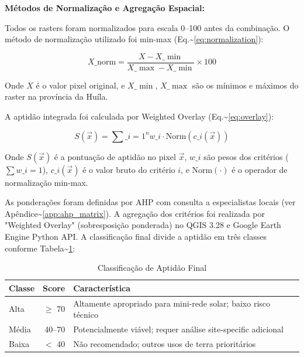 \documentclass[12pt, a4paper]{article}
\begin{document}
\noindent \textbf{Métodos de Normalização e Agregação Espacial:}

Todos os rasters foram normalizados para escala 0–100 antes da combinação. O método de normalização utilizado foi min-max (Eq.\textasciitilde{}\ref{eq:normalization}):

\begin{equation}
\label{eq:normalization}
X\_{\text{norm}} = \frac{X - X\_{\min}}{X\_{\max} - X\_{\min}} \times 100
\end{equation}

Onde $X$ é o valor pixel original, e $X\_{\min}$, $X\_{\max}$ são os mínimos e máximos do raster na província da Huíla.

A aptidão integrada foi calculada por Weighted Overlay (Eq.\textasciitilde{}\ref{eq:overlay}):

\begin{equation}
\label{eq:overlay}
S(\vec{x}) = \sum\_{i=1}^{n} w\_i \cdot \text{Norm}(c\_{i}(\vec{x}))
\end{equation}

Onde $S(\vec{x})$ é a pontuação de aptidão no pixel $\vec{x}$, $w\_i$ são pesos dos critérios ($\sum w\_i = 1$), $c\_i(\vec{x})$ é o valor bruto do critério $i$, e $\text{Norm}(\cdot)$ é o operador de normalização min-max.

As ponderações foram definidas por AHP com consulta a especialistas locais (ver Apêndice\textasciitilde{}\ref{app:ahp_matrix}). A agregação dos critérios foi realizada por "Weighted Overlay" (sobresposição ponderada) no QGIS 3.28 e Google Earth Engine Python API. A classificação final divide a aptidão em três classes conforme Tabela\textasciitilde{}\ref{tab:aptitude_classes}:

\begin{table}[H]
\centering
\caption{Classificação de Aptidão Final}
\label{tab:aptitude_classes}

\small
\begin{tabular}{lrl}
\toprule
\rowcolor{LightBlue}\textbf{Classe} & \textbf{Score} & \textbf{Característica} \\
\midrule
Alta & $\geq$ 70 & Altamente apropriado para mini-rede solar; baixo risco técnico \\
Média & 40–70 & Potencialmente viável; requer análise site-specific adicional \\
Baixa & $<$ 40 & Não recomendado; outros usos de terra prioritários \\
\bottomrule
\end{tabular}
\end{table}
\end{document}
